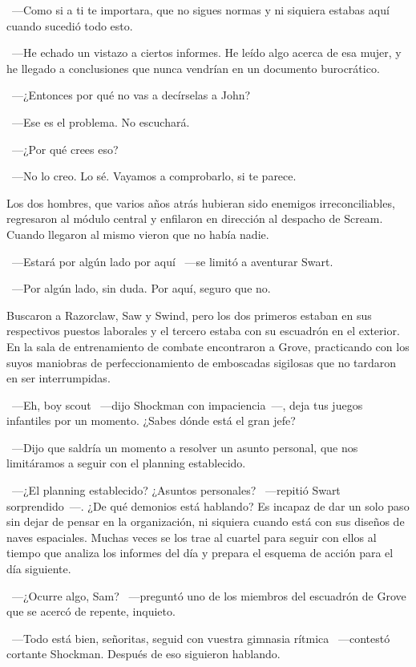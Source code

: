 ~---Como si a ti te importara, que no sigues normas y ni siquiera estabas aquí cuando sucedió todo esto.

~---He echado un vistazo a ciertos informes. He leído algo acerca de esa mujer, y he llegado a conclusiones que nunca vendrían en un documento burocrático.

~---¿Entonces por qué no vas a decírselas a John?

~---Ese es el problema. No escuchará.

~---¿Por qué crees eso?

~---No lo creo. Lo sé. Vayamos a comprobarlo, si te parece.

Los dos hombres, que varios años atrás hubieran sido enemigos irreconciliables, regresaron al módulo central y enfilaron en dirección al despacho de Scream. Cuando llegaron al mismo vieron que no había nadie.

~---Estará por algún lado por aquí ~---se limitó a aventurar Swart.

~---Por algún lado, sin duda. Por aquí, seguro que no.

Buscaron a Razorclaw, Saw y Swind, pero los dos primeros estaban en sus respectivos puestos laborales y el tercero estaba con su escuadrón en el exterior. En la sala de entrenamiento de combate encontraron a Grove, practicando con los suyos maniobras de perfeccionamiento de emboscadas sigilosas que no tardaron en ser interrumpidas.

~---Eh, boy scout ~---dijo Shockman con impaciencia~---, deja tus juegos infantiles por un momento. ¿Sabes dónde está el gran jefe?

~---Dijo que saldría un momento a resolver un asunto personal, que nos limitáramos a seguir con el planning establecido.

~---¿El planning establecido? ¿Asuntos personales? ~---repitió Swart sorprendido~---. ¿De qué demonios está hablando? Es incapaz de dar un solo paso sin dejar de pensar en la organización, ni siquiera cuando está con sus diseños de naves espaciales. Muchas veces se los trae al cuartel para seguir con ellos al tiempo que analiza los informes del día y prepara el esquema de acción para el día siguiente.

~---¿Ocurre algo, Sam? ~---preguntó uno de los miembros del escuadrón de Grove que se acercó de repente, inquieto.

~---Todo está bien, señoritas, seguid con vuestra gimnasia rítmica ~---contestó cortante Shockman. Después de eso siguieron hablando.

